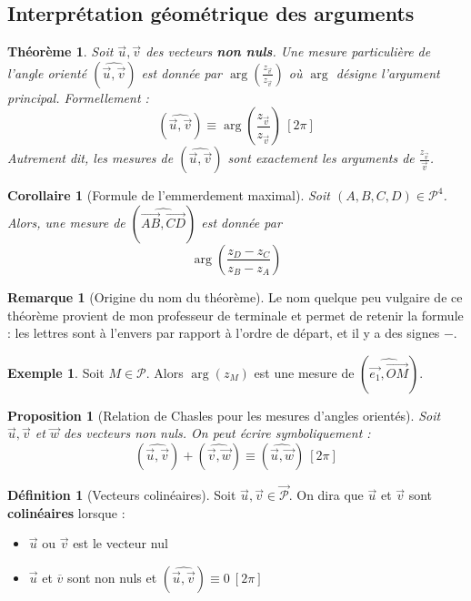 \documentclass[french]{book}
\theoremstyle{plain}
\newtheorem{thm}{Théorème}[chapter]
\newtheorem{prop}{Proposition}[chapter]
\newtheorem{cor}{Corollaire}[chapter]
\theoremstyle{definition}
\newtheorem{dfn}{Définition}[chapter]
\newtheorem{exa}{Exemple}[chapter]
\newtheorem{rmq}{Remarque}[chapter]
\theoremstyle{remark}
\begin{document}
\subsection{Interprétation géométrique des arguments}
\begin{thm}
	Soit $\overrightarrow{u},\overrightarrow{v}$ des vecteurs \textbf{non nuls}. Une mesure particulière de l'angle orienté $(\widehat{\overrightarrow{u},\overrightarrow{v}})$ est donnée par $\displaystyle\arg\left(\frac{z_{\overrightarrow{v}}}{z_{\overrightarrow{v}}}\right)$ où $\arg$ désigne l'argument principal. Formellement : $$(\widehat{\overrightarrow{u},\overrightarrow{v}}) \equiv \arg\left(\frac{z_{\overrightarrow{v}}}{z_{\overrightarrow{v}}}\right) \ [2\pi]$$ Autrement dit, les mesures de $(\widehat{\overrightarrow{u},\overrightarrow{v}})$ sont exactement les arguments de $\displaystyle\frac{z_{\overrightarrow{v}}}{\overrightarrow{v}}$.
\end{thm}
\begin{cor}[Formule de l'emmerdement maximal]
	Soit $(A,B,C,D)\in\mathcal{P}^4$. Alors, une mesure de $(\widehat{\overrightarrow{AB},\overrightarrow{CD}})$ est donnée par $$\arg\left(\frac{z_D-z_C}{z_B-z_A}\right)$$
\end{cor}
\begin{rmq}[Origine du nom du théorème]
	Le nom quelque peu vulgaire de ce théorème provient de mon professeur de terminale et permet de retenir la formule : les lettres sont à l'envers par rapport à l'ordre de départ, et il y a des signes $-$.
\end{rmq}
\begin{exa}
	Soit $M\in\mathcal{P}$. Alors $\arg(z_M)$ est une mesure de $(\widehat{\overrightarrow{e_1},\overrightarrow{OM}})$.
\end{exa}
\begin{prop}[Relation de Chasles pour les mesures d'angles orientés]
	Soit $\overrightarrow{u},\overrightarrow{v}$ et $\overrightarrow{w}$ des vecteurs non nuls. On peut écrire symboliquement : $$(\widehat{\overrightarrow{u},\overrightarrow{v}})+(\widehat{\overrightarrow{v},\overrightarrow{w}})\equiv (\widehat{\overrightarrow{u},\overrightarrow{w}})\ [2\pi]$$
\end{prop}
\begin{dfn}[Vecteurs colinéaires]
	Soit $\overrightarrow{u},\overrightarrow{v}\in\overrightarrow{\mathcal{P}}$. On dira que $\overrightarrow{u}$ et $\overrightarrow{v}$ sont \textbf{colinéaires} lorsque : \begin{itemize}
		\item $\overrightarrow{u}$ ou $\overrightarrow{v}$ est le vecteur nul
		\item $\overrightarrow{u}$ et $\overline{v}$ sont non nuls et $(\widehat{\overrightarrow{u},\overrightarrow{v}})\equiv 0\ [2\pi]$
	\end{itemize}
\end{dfn}
\end{document}
